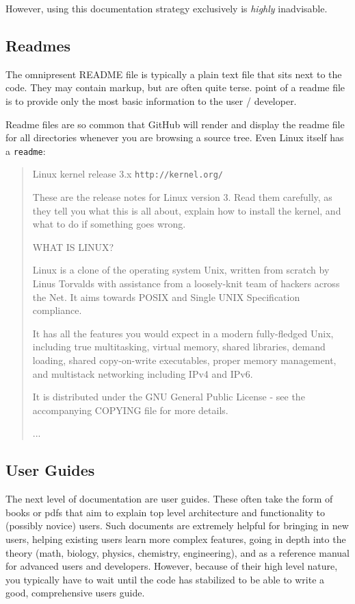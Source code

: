 However, using this documentation strategy exclusively is {\itshape highly} inadvisable.

\subsection*{Readmes}

The omnipresent {\ttfamily R\+E\+A\+D\+ME} file is typically a plain text file that sits next to the code. They may contain markup, but are often quite terse. point of a readme file is to provide only the most basic information to the user / developer.

Readme files are so common that Git\+Hub will render and display the readme file for all directories whenever you are browsing a source tree. Even Linux itself has a {\tt readme}\+:

\begin{quote}
Linux kernel release 3.\+x {\tt http\+://kernel.\+org/}

These are the release notes for Linux version 3. Read them carefully, as they tell you what this is all about, explain how to install the kernel, and what to do if something goes wrong.

W\+H\+AT IS L\+I\+N\+UX?

Linux is a clone of the operating system Unix, written from scratch by Linus Torvalds with assistance from a loosely-\/knit team of hackers across the Net. It aims towards P\+O\+S\+IX and Single U\+N\+IX Specification compliance.

It has all the features you would expect in a modern fully-\/fledged Unix, including true multitasking, virtual memory, shared libraries, demand loading, shared copy-\/on-\/write executables, proper memory management, and multistack networking including I\+Pv4 and I\+Pv6.

It is distributed under the G\+NU General Public License -\/ see the accompanying C\+O\+P\+Y\+I\+NG file for more details.

... \end{quote}


\subsection*{User Guides}

The next level of documentation are user guides. These often take the form of books or pdfs that aim to explain top level architecture and functionality to (possibly novice) users. Such documents are extremely helpful for bringing in new users, helping existing users learn more complex features, going in depth into the theory (math, biology, physics, chemistry, engineering), and as a reference manual for advanced users and developers. However, because of their high level nature, you typically have to wait until the code has stabilized to be able to write a good, comprehensive user\textquotesingle{}s guide.

